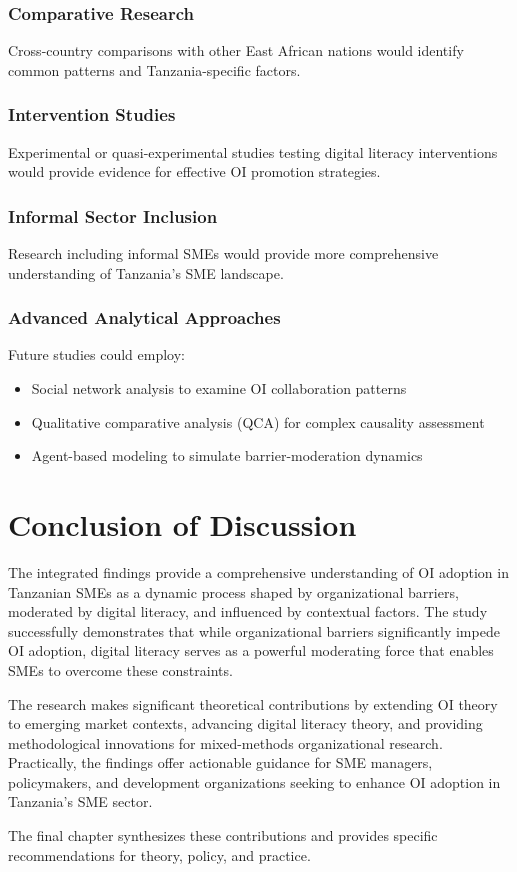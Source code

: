 \subsubsection{Comparative Research}
Cross-country comparisons with other East African nations would identify common patterns and Tanzania-specific factors.

\subsubsection{Intervention Studies}
Experimental or quasi-experimental studies testing digital literacy interventions would provide evidence for effective OI promotion strategies.

\subsubsection{Informal Sector Inclusion}
Research including informal SMEs would provide more comprehensive understanding of Tanzania's SME landscape.

\subsubsection{Advanced Analytical Approaches}
Future studies could employ:
\begin{itemize}
    \item Social network analysis to examine OI collaboration patterns
    \item Qualitative comparative analysis (QCA) for complex causality assessment
    \item Agent-based modeling to simulate barrier-moderation dynamics
\end{itemize}

\section{Conclusion of Discussion}

The integrated findings provide a comprehensive understanding of OI adoption in Tanzanian SMEs as a dynamic process shaped by organizational barriers, moderated by digital literacy, and influenced by contextual factors. The study successfully demonstrates that while organizational barriers significantly impede OI adoption, digital literacy serves as a powerful moderating force that enables SMEs to overcome these constraints.

The research makes significant theoretical contributions by extending OI theory to emerging market contexts, advancing digital literacy theory, and providing methodological innovations for mixed-methods organizational research. Practically, the findings offer actionable guidance for SME managers, policymakers, and development organizations seeking to enhance OI adoption in Tanzania's SME sector.

The final chapter synthesizes these contributions and provides specific recommendations for theory, policy, and practice.